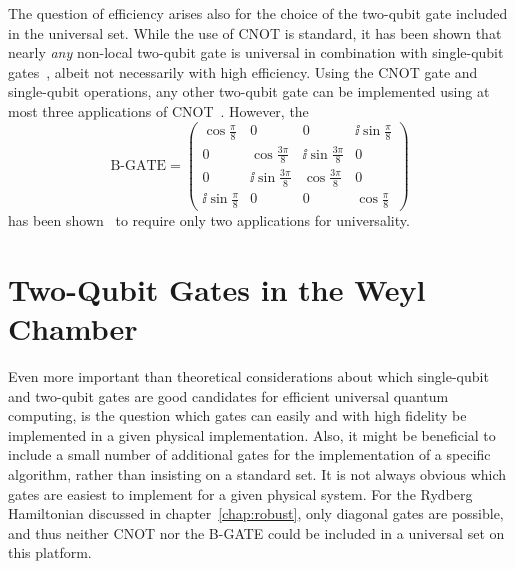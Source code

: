 The question of efficiency arises also for the choice of the two-qubit gate
included in the universal set. While the use of CNOT is standard, it has been
shown that nearly \emph{any} non-local two-qubit gate is universal in
combination with single-qubit gates~\cite{DeutschPRSA1995, ZhangPRL2003}, albeit
not necessarily with high efficiency. Using the CNOT gate and single-qubit
operations, any other two-qubit gate can be implemented using at most three
applications of CNOT~\cite{VidalPRA2004}. However, the
\begin{equation}
\text{B-GATE} =
  \begin{pmatrix}
  \cos\frac{\pi}{8} & 0 & 0  & \ii \sin\frac{\pi}{8} \\
  0 & \cos\frac{3\pi}{8} & \ii \sin\frac{3\pi}{8} & 0 \\
  0 & \ii \sin\frac{3\pi}{8} & \cos\frac{3\pi}{8} & 0 \\
  \ii \sin\frac{\pi}{8} & 0 & 0 & \cos\frac{\pi}{8}
  \end{pmatrix}
\end{equation}
%
has been shown~\cite{ZhangPRL2004} to require only two applications for
universality.

\section{Two-Qubit Gates in the Weyl Chamber}
\label{sec:C_LI}

Even more important than theoretical considerations about which single-qubit
and two-qubit gates are good candidates for efficient universal quantum
computing, is the question which gates can easily and with high fidelity be
implemented in a given physical implementation. Also, it might be beneficial to
include a small number of additional gates for the implementation of a specific
algorithm, rather than insisting on a standard set.
It is not always obvious which gates are easiest to implement for a given
physical system. For the Rydberg Hamiltonian discussed in chapter~\ref{chap:robust},
only diagonal gates are possible, and thus neither CNOT nor the B-GATE could be
included in a universal set on this platform.

